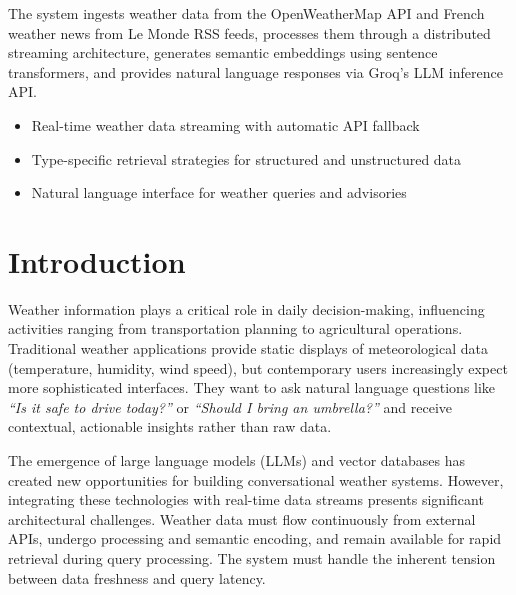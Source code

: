 \documentclass[11pt,a4paper]{article}
\begin{document}
\vspace{0.5em}

\noindent
The system ingests weather data from the OpenWeatherMap API and French weather news from Le Monde RSS feeds, processes them through a distributed streaming architecture, generates semantic embeddings using sentence transformers, and provides natural language responses via Groq's LLM inference API.

\vspace{1em}

\begin{highlightbox}
\begin{itemize}[leftmargin=1.5em, itemsep=0.2em, topsep=0.3em]
    \item Real-time weather data streaming with automatic API fallback
    \item Type-specific retrieval strategies for structured and unstructured data
    \item Natural language interface for weather queries and advisories
\end{itemize}
\end{highlightbox}


\newpage

\tableofcontents
\newpage

\section{Introduction}

Weather information plays a critical role in daily decision-making, influencing activities ranging from transportation planning to agricultural operations. Traditional weather applications provide static displays of meteorological data (temperature, humidity, wind speed), but contemporary users increasingly expect more sophisticated interfaces. They want to ask natural language questions like \textit{``Is it safe to drive today?''} or \textit{``Should I bring an umbrella?''} and receive contextual, actionable insights rather than raw data.

The emergence of large language models (LLMs) and vector databases has created new opportunities for building conversational weather systems. However, integrating these technologies with real-time data streams presents significant architectural challenges. Weather data must flow continuously from external APIs, undergo processing and semantic encoding, and remain available for rapid retrieval during query processing. The system must handle the inherent tension between data freshness and query latency.
\end{document}

